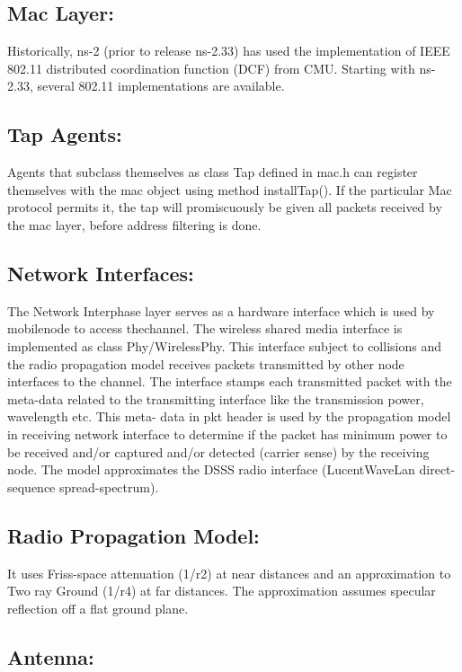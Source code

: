 \documentclass[11pt]{article}
\begin{document}
\subsection{Mac Layer: }


Historically, ns-2 (prior to release ns-2.33) has used the implementation of IEEE 802.11
distributed coordination function (DCF) from CMU. Starting with ns-2.33, several 802.11
implementations are available.
\subsection{Tap Agents: }


Agents that subclass themselves as class Tap defined in mac.h can register themselves with
the mac object using method installTap(). If the particular Mac protocol permits it, the tap will
promiscuously be given all packets received by the mac layer, before address filtering is done.
\subsection{Network Interfaces: }


The Network Interphase layer serves as a hardware interface which is used by
mobilenode to access thechannel. The wireless shared media interface is implemented as class
Phy/WirelessPhy. This interface subject to collisions and the radio propagation model receives packets
transmitted by other node interfaces to the channel. The interface stamps each transmitted packet with the
meta-data related to the transmitting interface like the transmission power, wavelength etc. This meta-
data in pkt header is used by the propagation model in receiving network interface to determine if the
packet has minimum power to be received and/or captured and/or detected (carrier sense) by the
receiving node. The model approximates the DSSS radio interface (LucentWaveLan direct-sequence
spread-spectrum).
\subsection{Radio Propagation Model: }


It uses Friss-space attenuation (1/r2) at near distances and an approximation
to Two ray Ground (1/r4) at far distances. The approximation assumes specular reflection off a flat
ground plane.
\subsection{Antenna: }
\end{document}
